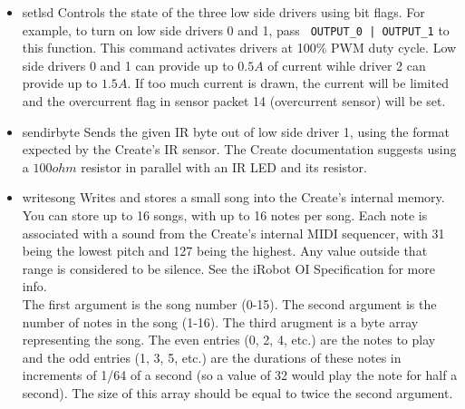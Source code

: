 \documentclass {article}
\begin{document}
\begin {itemize}
\item {} {setlsd}
  Controls the state of the three low side drivers using bit flags.
  For example, to turn on low side drivers 0 and 1, pass {\tt
    OUTPUT\_0 | OUTPUT\_1} to this function.  This command activates
  drivers at 100\% PWM duty cycle.  Low side drivers 0 and 1 can
  provide up to $0.5A$ of current wihle driver 2 can provide up to
  $1.5A$.  If too much current is drawn, the current will be limited
  and the overcurrent flag in sensor packet 14 (overcurrent
  sensor) will be set. \\
  \retnorm

\item {} {sendirbyte} Sends the
  given IR byte out of low side driver 1, using the format expected by
  the Create's IR sensor.  The Create documentation suggests using a
  $100ohm$ resistor in parallel with an
  IR LED and its resistor. \\
  \retnorm

\item {} {writesong} Writes and stores a small song into the
  Create's internal memory.  You can store up to 16 songs, with up to
  16 notes per song.  Each note is associated with a sound from the
  Create's internal MIDI sequencer, with 31 being the lowest pitch and
  127 being the highest.  Any value outside that range is considered
  to be silence.  See the iRobot OI Specification for
  more info. \\
  The first argument is the song number (0-15).  The second argument
  is the number of notes in the song (1-16).  The third arugment is a
  byte array representing the song.  The even entries (0, 2, 4, etc.)
  are the notes to play and the odd entries (1, 3, 5, etc.) are the
  durations of these notes in increments of 1/64 of a second (so a
  value of 32 would play the note for half a second).  The size of
  this array should be equal to twice the second
  argument. \\
  \retnorm


\end{itemize}
\end{document}
